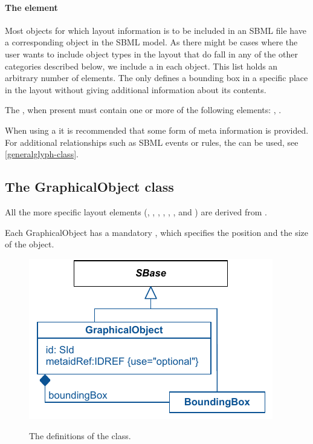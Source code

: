 \paragraph{The  element}
\label{listofadditionalgraphicalobjects-class}
Most objects for which layout information is to be included in an SBML 
file have a corresponding object in the SBML model. As there might be 
cases where the user wants to include object types in the layout that do 
fall in any of the other categories described below, we include a 
 in each \Layout object. This 
list holds an arbitrary number of  elements. The 
 only defines a bounding box in a specific place 
in the layout without giving additional information about its contents. 

The , when present must contain 
one or more of the following elements: \GraphicalObject, \GeneralGlyph. 

When using a \GraphicalObject it is recommended that some form of meta 
information is provided. For additional relationships such as SBML events 
or rules, the \GeneralGlyph can be used, see \ref{generalglyph-class}. 

\subsection{The GraphicalObject class} 
\label{graphicalobject-class}
All the more specific layout elements (\CompartmentGlyph, \GeneralGlyph, 
\SpeciesGlyph, \ReactionGlyph, \ReferenceGlyph, \TextGlyph, and 
\SpeciesReferenceGlyph) are derived from \GraphicalObject. 

Each GraphicalObject has a mandatory \BoundingBox, which specifies the position 
and the size of the object. 

\begin{figure}[!h]
\includegraphics{uml/layout-graphicalobject-uml}\\
\label{uml:graphicalobject}
\caption{The definitions of the \GraphicalObject class.}
\end{figure}

